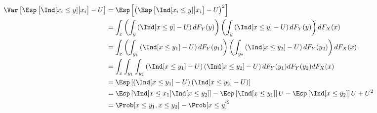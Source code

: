 \documentclass[12pt]{article}
\begin{document}
\begin{align*}
\Var\left[ \Esp\left[ \Ind[x_i \leq y] \big| x_i\right] - U\right] &= \Esp\left[ \left(\Esp\left[ \Ind[x_i \leq y] \big| x_i\right] - U\right)^2\right]  \\
&= \int_{x} \left(\int_y \left(\Ind[x \leq y] - U \right) dF_Y(y)\right)  \left(\int_y \left(\Ind[x \leq y] - U \right) dF_Y(y)\right) dF_{X}(x)\\
&= \int_{x} \left(\int_{y_1} \left(\Ind[x \leq y_1] - U \right) dF_Y(y_1)\right)  \left(\int_{y_2} \left(\Ind[x \leq y_2] - U \right) dF_Y(y_2)\right) dF_{X}(x)\\
&= \int_{x} \int_{y_1} \int_{y_2} \left(\Ind[x \leq y_1] - U \right) \left(\Ind[x \leq y_2] - U \right) dF_Y(y_1) dF_Y(y_2) dF_{X}(x)\\
&= \Esp\left[\left( \Ind[x \leq y_1] - U\right)\left(\Ind[x \leq y_2] - U\right)\right] \\
&= \Esp\left[\Ind[x \leq x_1]  \Ind[x \leq y_2] \right] - \Esp\left[\Ind[x \leq y_1]\right] U  - \Esp\left[\Ind[x \leq y_2]\right] U + U^2 \\
&= \Prob[x \leq y_1, x \leq y_2] - \Prob[x \leq y]^2
\end{align*}
\end{document}
